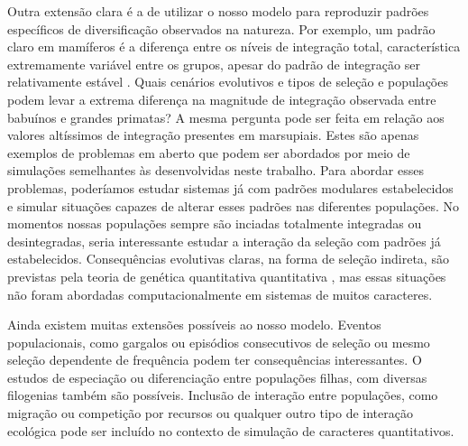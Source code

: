 Outra extensão clara é a de utilizar o nosso modelo para reproduzir
padrões específicos de diversificação observados na natureza. 
Por exemplo, um padrão claro em mamíferos é a diferença entre os níveis
de integração total, característica extremamente variável entre os
grupos, apesar do padrão de integração ser relativamente estável
\cite{Porto2009}. 
Quais cenários evolutivos e tipos de seleção e populações podem levar a
extrema diferença na magnitude de integração observada entre babuínos e grandes
primatas?
A mesma pergunta pode ser feita em relação aos valores altíssimos de
integração presentes em marsupiais. 
Estes são apenas exemplos de problemas em aberto que podem ser abordados
por meio de simulações semelhantes às desenvolvidas neste trabalho. 
Para abordar esses problemas, poderíamos estudar sistemas já com padrões
modulares estabelecidos e simular situações capazes de alterar esses padrões 
nas diferentes populações. 
No momentos nossas populações sempre são inciadas totalmente integradas
ou desintegradas, seria interessante estudar a interação da seleção com
padrões já estabelecidos.
Consequências evolutivas claras, na forma de seleção indireta, são
previstas pela teoria de genética quantitativa quantitativa
\citep{Lande1983, Barton1987}, mas essas situações não foram abordadas
computacionalmente em sistemas de muitos caracteres.

Ainda existem muitas extensões possíveis ao nosso modelo. 
Eventos populacionais, como gargalos ou episódios consecutivos de
seleção ou mesmo seleção dependente de frequência podem ter
consequências interessantes. 
O estudos de especiação ou diferenciação entre populações filhas, com
diversas filogenias também são possíveis. 
Inclusão de interação entre populações, como migração ou competição por
recursos ou qualquer outro tipo de interação ecológica pode ser incluído
no contexto de simulação de caracteres quantitativos. 
